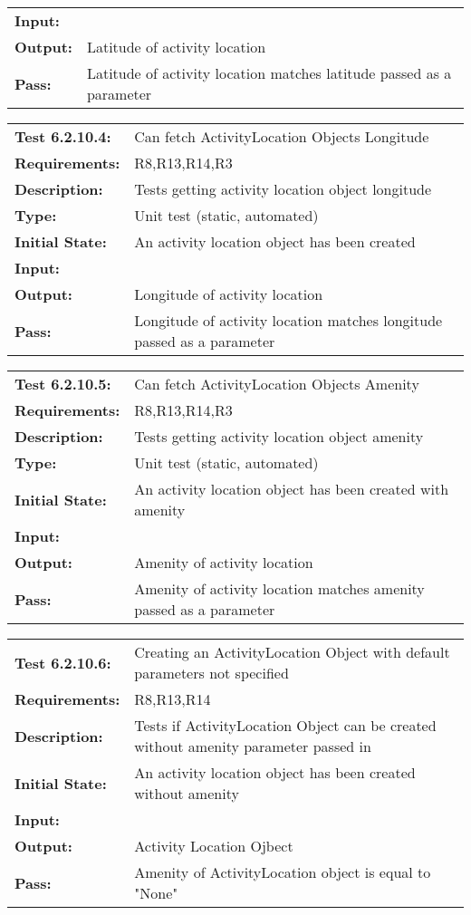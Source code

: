 \documentclass[12pt, titlepage]{article}
\begin{document}
{\begin{tabular}{|l|p{10cm}|}
    \bf{Input}: & \\
    \bf{Output}: & Latitude of activity location\\
    \bf{Pass}: & Latitude of activity location matches latitude passed as a parameter \\
    \hline
\end{tabular}
\begin{tabular}{|l|p{10cm}|}
    \hline
    \bf{Test} 6.2.10.4: & Can fetch ActivityLocation Objects Longitude\\
    \bf{Requirements}: &  R8,R13,R14,R3\\
    \bf{Description}: & Tests getting activity location object longitude\\
    \bf{Type}: & Unit test (static, automated) \\
    \bf{Initial State}: & An activity location object has been created\\
    \bf{Input}: & \\
    \bf{Output}: & Longitude of activity location\\
    \bf{Pass}: & Longitude of activity location matches longitude passed as a parameter \\
    \hline
\end{tabular}
\begin{tabular}{|l|p{10cm}|}
    \hline
    \bf{Test} 6.2.10.5: & Can fetch ActivityLocation Objects Amenity\\
    \bf{Requirements}: &  R8,R13,R14,R3\\
    \bf{Description}: & Tests getting activity location object amenity\\
    \bf{Type}: & Unit test (static, automated) \\
    \bf{Initial State}: & An activity location object has been created with amenity\\
    \bf{Input}: & \\
    \bf{Output}: & Amenity of activity location\\
    \bf{Pass}: & Amenity of activity location matches amenity passed as a parameter \\
    \hline
\end{tabular}
\begin{tabular}{|l|p{10cm}|}
    \hline
    \bf{Test} 6.2.10.6: & Creating an ActivityLocation Object with default parameters not specified\\
    \bf{Requirements}: &  R8,R13,R14\\
    \bf{Description}: & Tests if ActivityLocation Object can be created without amenity parameter passed in \\
    \bf{Initial State}: & An activity location object has been created without amenity\\
    \bf{Input}: & \\
    \bf{Output}: & Activity Location Ojbect\\
    \bf{Pass}: & Amenity of ActivityLocation object is equal to "None"\\
    \hline
\end{tabular}
}
\end{document}
